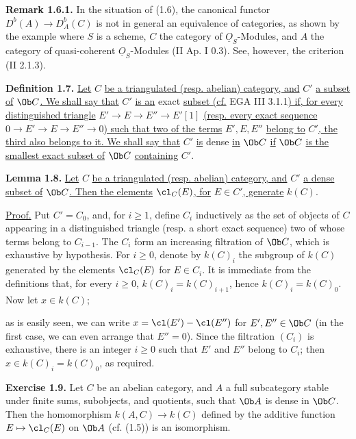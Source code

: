 \textbf{Remark 1.6.1.} In the situation of (1.6), the canonical functor \(D^b(A)\longrightarrow D_A^b(C)\) is not in general an equivalence of categories, as shown by the example where \(S\) is a scheme, \(C\) the category of \(\underline{O}_S\)-Modules, and \(A\) the category of quasi-coherent \(\underline{O}_S\)-Modules (II Ap. I 0.3). See, however, the criterion (II 2.1.3).

\textbf{Definition 1.7.} \uline{Let} \(C\) \uline{be a triangulated (resp. abelian) category, and} \(C'\) \uline{a subset of} \(\Ob C\)\uline{. We shall say that} \(C'\) \uline{is an} exact \uline{subset (cf.} EGA III 3.1.1\uline{) if, for every distinguished triangle} \(E'\to E\to E''\to E'[1]\) \uline{(resp. every exact sequence} \(0\to E'\to E\to E''\to0\)\uline{) such that two of the terms} \(E',E,E''\) \uline{belong to} \(C'\)\uline{, the third also belongs to it. We shall say that} \(C'\) \uline{is} dense \uline{in} \(\Ob C\) \uline{if} \(\Ob C\) \uline{is the smallest exact subset of} \(\Ob C\) \uline{containing} \(C'\).

\textbf{Lemma 1.8.} \uline{Let} \(C\) \uline{be a triangulated (resp. abelian) category, and} \(C'\) \uline{a dense subset of} \(\Ob C\)\uline{. Then the elements} \(\cl_C(E)\)\uline{, for} \(E\in C'\)\uline{, generate} \(k(C)\).

\uline{Proof.} Put \(C'=C_0\), and, for \(i\geq1\), define \(C_i\) inductively as the set of objects of \(C\) appearing in a distinguished triangle (resp. a short exact sequence) two of whose terms belong to \(C_{i-1}\). The \(C_i\) form an increasing filtration of \(\Ob C\), which is exhaustive by hypothesis. For \(i\geq0\), denote by \(k(C)_i\) the subgroup of \(k(C)\) generated by the elements \(\cl_C(E)\) for \(E\in C_i\). It is immediate from the definitions that, for every \(i\geq0\), \(k(C)_i=k(C)_{i+1}\), hence \(k(C)_i=k(C)_0\). Now let \(x\in k(C)\);

%
as is easily seen, we can write \(x=\cl(E')-\cl(E'')\) for \(E',E''\in\Ob C\) (in the first case, we can even arrange that \(E''=0\)). Since the filtration \((C_i)\) is exhaustive, there is an integer \(i\geq0\) such that \(E'\) and \(E''\) belong to \(C_i\); then \(x\in k(C)_i=k(C)_0\), as required.

\textbf{Exercise 1.9.} Let \(C\) be an abelian category, and \(A\) a full subcategory stable under finite sums, subobjects, and quotients, such that \(\Ob A\) is dense in \(\Ob C\). Then the homomorphism \(k(A,C)\longrightarrow k(C)\) defined by the additive function \(E\mapsto\cl_C(E)\) on \(\Ob A\) (cf. (1.5)) is an isomorphism.


